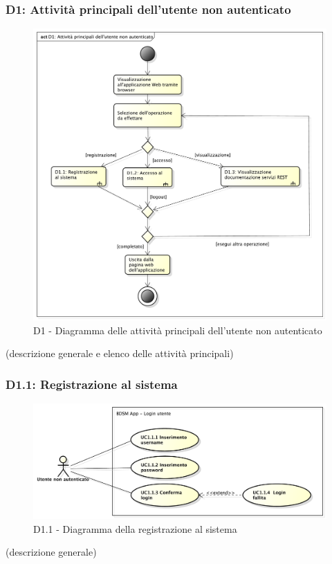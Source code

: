 		\subsubsection{D1: Attività principali dell'utente non autenticato} %
		\label{ssub:attivita_principali_dell_utente_non_autenticato}
		\begin{figure}[!htbp]
			\centering
			\centerline{\includegraphics[scale=0.40]{./images/D1.pdf}}
			\caption{D1 - Diagramma delle attività principali dell'utente non autenticato}
		\end{figure}
		\noindent
		[TO DO] (descrizione generale e elenco delle attività principali)


		\subsubsection{D1.1: Registrazione al sistema} %
		\label{ssub:registrazione_al_sistema}
		\begin{figure}[!htbp]
			\centering
			\centerline{\includegraphics[scale=0.45]{./images/UC1_1.pdf}}
			\caption{D1.1 - Diagramma della registrazione al sistema}
		\end{figure}
		\noindent
		[TO DO] (descrizione generale)

